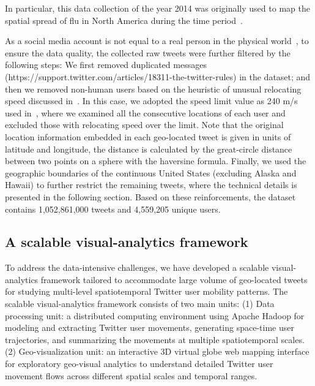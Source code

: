 \documentclass[ijgi,article,accept,moreauthors,pdftex,10pt,a4paper]{mdpi}
\theoremstyle{mdpi}
\newcounter{ex}
\newcounter{re}
\theoremstyle{mdpidefinition}
\begin{document}
In particular, this data collection of the year 2014 was originally used to map the spatial spread of flu in North America during the time period~\cite{padmanabhan2014flumapper}.

As a social media account is not equal to a real person in the physical world~\cite{tsou2015}, to ensure the data quality, the collected raw tweets were further filtered by the following steps: We first removed duplicated messages (https://support.twitter.com/articles/18311-the-twitter-rules) in the dataset; and then we removed non-human users based on the heuristic of unusual relocating speed discussed in~\cite{hawelka2014geo,Jurdak2015}. 
In this case, we adopted the speed limit value as 240 m/s used in~\cite{Jurdak2015}, where we examined all the consecutive locations of each user and excluded those with relocating speed over the limit.
Note that the original location information embedded in each geo-located tweet is given in units of latitude and longitude, the distance is calculated by the great-circle distance between two points on a sphere with the haversine formula.
Finally, we used the geographic boundaries of the continuous United States (excluding Alaska and Hawaii) to further restrict the remaining tweets, where the technical details is presented in the following section. Based on these reinforcements, the dataset contains 1,052,861,000 tweets and 4,559,205 unique users.

\subsection{A scalable visual-analytics framework}
To address the data-intensive challenges, we have developed a scalable visual-analytics framework tailored to accommodate large volume of geo-located tweets for studying multi-level spatiotemporal Twitter user mobility patterns.
The scalable visual-analytics framework consists of two main units: (1) Data processing unit: a distributed computing environment using Apache Hadoop for modeling and extracting Twitter user movements, generating space-time user trajectories, and summarizing the movements at multiple spatiotemporal scales.
(2) Geo-visualization unit: an interactive 3D virtual globe web mapping interface for exploratory geo-visual analytics to understand detailed Twitter user movement flows across different spatial scales and temporal ranges. 
\end{document}

